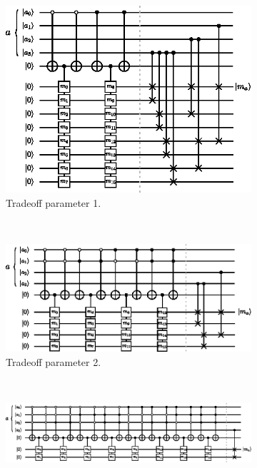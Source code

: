 \documentclass[a4paper,12pt]{article}
\begin{document}
\begin{figure}[ht!]
\centering
 \captionsetup{width=0.89\linewidth}
\begin{subfigure}{0.6\textwidth}
 \centering
 \includegraphics[scale=1.3]{images/select-swap-lambda-1}
 \caption{Tradeoff parameter 1.}
 \label{fig:select-swap-1}
 \end{subfigure} \\ \vspace{0.5cm}
\begin{subfigure}[ht!]{0.8\textwidth}
 \centering
 \includegraphics[scale=1.3]{images/select-swap-lambda-2}
 \caption{Tradeoff parameter 2.}
 \label{fig:select-swap-2}
 \end{subfigure} \\ \vspace{0.5cm}
\begin{subfigure}[ht!]{\textwidth}
 \centering
 \includegraphics[scale=1.3]{images/select-swap-lambda-3}

\end{subfigure}
\end{figure}
\end{document}
